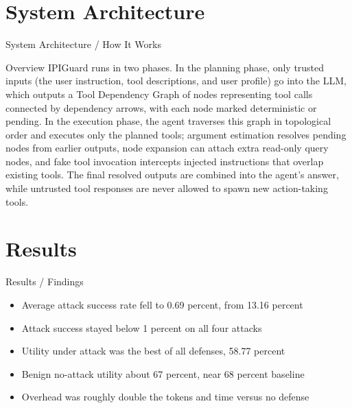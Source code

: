 \documentclass[10pt]{beamer}
\begin{document}
\section{System Architecture}
\begin{frame}{System Architecture / How It Works}
  \begin{block}{Overview}
  IPIGuard runs in two phases. In the planning phase, only trusted inputs (the user instruction, tool descriptions, and user profile) go into the LLM, which outputs a Tool Dependency Graph of nodes representing tool calls connected by dependency arrows, with each node marked deterministic or pending. In the execution phase, the agent traverses this graph in topological order and executes only the planned tools; argument estimation resolves pending nodes from earlier outputs, node expansion can attach extra read-only query nodes, and fake tool invocation intercepts injected instructions that overlap existing tools. The final resolved outputs are combined into the agent's answer, while untrusted tool responses are never allowed to spawn new action-taking tools.
  \end{block}
\end{frame}

\section{Results}
\begin{frame}[allowframebreaks]{Results / Findings}
\begin{itemize}
  \item Average attack success rate fell to 0.69 percent, from 13.16 percent
  \item Attack success stayed below 1 percent on all four attacks
  \item Utility under attack was the best of all defenses, 58.77 percent
  \item Benign no-attack utility about 67 percent, near 68 percent baseline
  \item Overhead was roughly double the tokens and time versus no defense
\end{itemize}
\end{frame}
\end{document}
